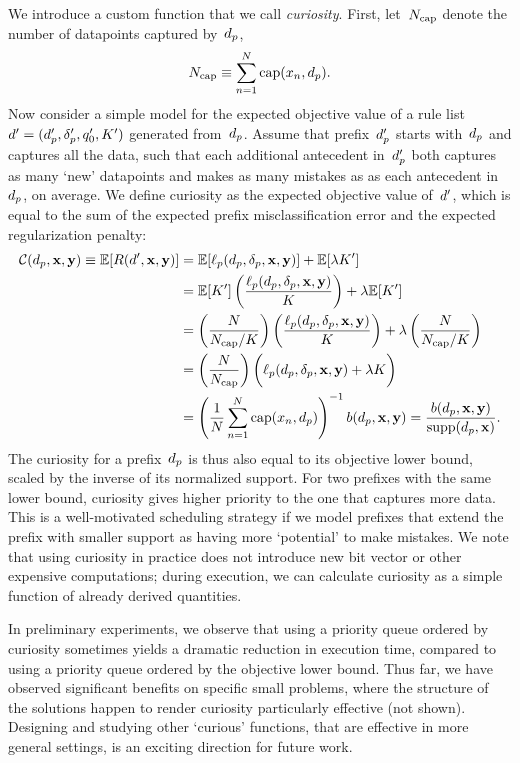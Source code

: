 \begin{arxiv}
We introduce a custom function that we call \emph{curiosity}.
%
First, let~$N_{\textnormal{cap}}$ denote the number of datapoints captured by~$d_p$, \ie
\begin{align}
N_{\textnormal{cap}} \equiv \sum_{n=1}^N \textnormal{cap}(x_n, d_p). \nonumber
\end{align}
%
Now consider a simple model for the expected objective value of a rule list
${{d}' = (d_p', \delta_p', q_0', K')}$ generated from~$d_p$.
%
Assume that prefix~$d_p'$ starts with~$d_p$ and captures all the data,
such that each additional antecedent in~$d_p'$
both captures as many `new' datapoints and makes as many mistakes as
as each antecedent in~$d_p$, on average.
%
We define curiosity as the expected objective value of~${d}'$,
which is equal to the sum of the expected prefix
misclassification error and the expected regularization penalty:
\begin{align}
\mathcal{C}(d_p, \mathbf{x}, \mathbf{y}) \equiv \mathbb{E}[ R({d}', \mathbf{x}, \mathbf{y}) ] &= \mathbb{E}[\ell_p(d_p, \delta_p, \mathbf{x}, \mathbf{y})] + \mathbb{E}[ {\lambda} K' ] \nonumber \\
&= \mathbb{E}[ K' ] \left(\frac{\ell_p(d_p, \delta_p, \mathbf{x}, \mathbf{y})}{K}\right) + {\lambda} \mathbb{E}[ K' ] \nonumber \\
&=  \left(\frac{N}{N_{\textnormal{cap}} / K}\right)
  \left(\frac{\ell_p(d_p, \delta_p, \mathbf{x}, \mathbf{y})}{K}\right)
  + {\lambda} \left(\frac{N}{N_{\textnormal{cap}} / K}\right) \nonumber \\
&= \left( \frac{N}{N_{\textnormal{cap}}} \right) \biggl(\ell_p(d_p, \delta_p, \mathbf{x}, \mathbf{y}) + {\lambda} K \biggr) \nonumber \\
&= \left( \frac{1}{N} \sum_{n=1}^N \textnormal{cap}(x_n, d_p) \right)^{-1} b(d_p, \mathbf{x}, \mathbf{y})
= \frac{b(d_p, \mathbf{x}, \mathbf{y})}{\textnormal{supp}(d_p, \mathbf{x})}. \nonumber
\end{align}
%
The curiosity for a prefix~$d_p$ is thus also equal to its objective lower bound,
scaled by the inverse of its normalized support.
%
For two prefixes with the same lower bound, curiosity gives higher priority to
the one that captures more data.
%
This is a well-motivated scheduling strategy if we model prefixes that extend
the prefix with smaller support as having more `potential' to make mistakes.
%
We note that using curiosity in practice does not introduce new bit vector
or other expensive computations; during execution, we can calculate curiosity
as a simple function of already derived quantities.

In preliminary experiments, we observe that using a priority queue ordered by
curiosity sometimes yields a dramatic reduction in execution time,
compared to using a priority queue ordered by the objective lower bound.
%
Thus far, we have observed significant benefits on specific small problems,
where the structure of the solutions happen to render curiosity particularly
effective (not shown).
%
Designing and studying other `curious' functions, that are effective in more
general settings, is an exciting direction for future work.
\end{arxiv}
